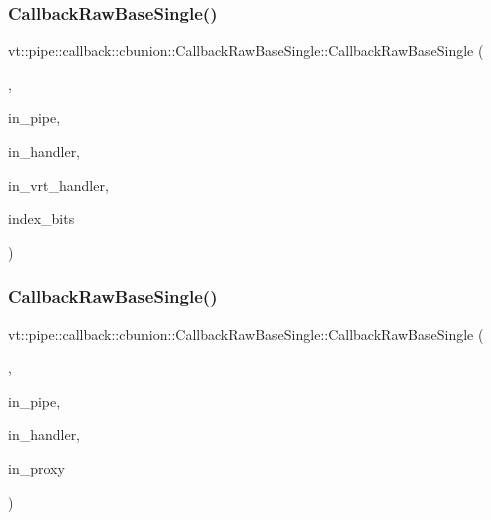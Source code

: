 \subsubsection{\texorpdfstring{Callback\+Raw\+Base\+Single()}{CallbackRawBaseSingle()}\hspace{0.1cm}{\footnotesize\ttfamily [11/13]}}
{\footnotesize\ttfamily vt\+::pipe\+::callback\+::cbunion\+::\+Callback\+Raw\+Base\+Single\+::\+Callback\+Raw\+Base\+Single (\begin{DoxyParamCaption}\item[{Raw\+Send\+Col\+Dir\+Tag\+Type}]{,  }\item[{\hyperlink{namespacevt_ac9852acda74d1896f48f406cd72c7bd3}{Pipe\+Type} const \&}]{in\+\_\+pipe,  }\item[{\hyperlink{namespacevt_af64846b57dfcaf104da3ef6967917573}{Handler\+Type} const}]{in\+\_\+handler,  }\item[{\hyperlink{structvt_1_1pipe_1_1callback_1_1cbunion_1_1_callback_raw_base_single_a734a9c83099de5bc1cd85f9da8dba7bb}{Auto\+Handler\+Type} const}]{in\+\_\+vrt\+\_\+handler,  }\item[{std\+::byte $\ast$}]{index\+\_\+bits }\end{DoxyParamCaption})}

\mbox{\label{structvt_1_1pipe_1_1callback_1_1cbunion_1_1_callback_raw_base_single_a2ff2eebe15a6b270473f61cfa2a9804a}} 
\subsubsection{\texorpdfstring{Callback\+Raw\+Base\+Single()}{CallbackRawBaseSingle()}\hspace{0.1cm}{\footnotesize\ttfamily [12/13]}}
{\footnotesize\ttfamily vt\+::pipe\+::callback\+::cbunion\+::\+Callback\+Raw\+Base\+Single\+::\+Callback\+Raw\+Base\+Single (\begin{DoxyParamCaption}\item[{Raw\+Bcast\+Obj\+Grp\+Tag\+Type}]{,  }\item[{\hyperlink{namespacevt_ac9852acda74d1896f48f406cd72c7bd3}{Pipe\+Type}}]{in\+\_\+pipe,  }\item[{\hyperlink{namespacevt_af64846b57dfcaf104da3ef6967917573}{Handler\+Type}}]{in\+\_\+handler,  }\item[{\hyperlink{namespacevt_ad7cae989df485fccca57f0792a880a8e}{Obj\+Group\+Proxy\+Type}}]{in\+\_\+proxy }\end{DoxyParamCaption})}

